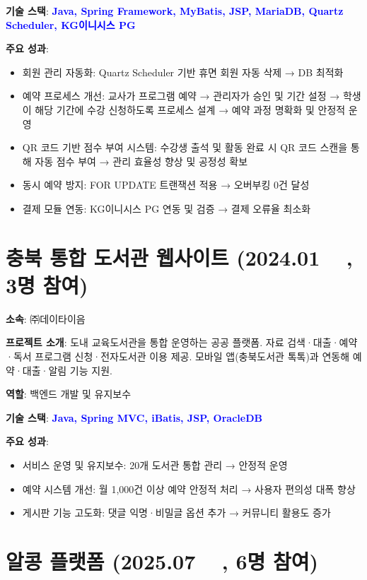 \documentclass[a4paper,11pt]{article}
\newcommand{\tech}[1]{\textbf{\textcolor{blue}{#1}}}
\begin{document}
\textbf{기술 스택}: \tech{Java, Spring Framework, MyBatis, JSP, MariaDB, Quartz Scheduler, KG이니시스 PG}

\textbf{주요 성과}:
\begin{itemize}[leftmargin=*]
  \item 회원 관리 자동화: Quartz Scheduler 기반 휴면 회원 자동 삭제 → DB 최적화
  \item 예약 프로세스 개선: 교사가 프로그램 예약 → 관리자가 승인 및 기간 설정 → 학생이 해당 기간에 수강 신청하도록 프로세스 설계 → 예약 과정 명확화 및 안정적 운영
  \item QR 코드 기반 점수 부여 시스템: 수강생 출석 및 활동 완료 시 QR 코드 스캔을 통해 자동 점수 부여 → 관리 효율성 향상 및 공정성 확보
  \item 동시 예약 방지: FOR UPDATE 트랜잭션 적용 → 오버부킹 0건 달성
  \item 결제 모듈 연동: KG이니시스 PG 연동 및 검증 → 결제 오류율 최소화
\end{itemize}

\section{충북 통합 도서관 웹사이트 (2024.01 ~ , 3명 참여)}

\textbf{소속}: ㈜데이타이음

\textbf{프로젝트 소개}:  
도내 교육도서관을 통합 운영하는 공공 플랫폼.  
자료 검색·대출·예약·독서 프로그램 신청·전자도서관 이용 제공.  
모바일 앱(충북도서관 톡톡)과 연동해 예약·대출·알림 기능 지원.

\textbf{역할}: 백엔드 개발 및 유지보수

\textbf{기술 스택}: \tech{Java, Spring MVC, iBatis, JSP, OracleDB}

\textbf{주요 성과}:
\begin{itemize}[leftmargin=*]
  \item 서비스 운영 및 유지보수: 20개 도서관 통합 관리 → 안정적 운영
  \item 예약 시스템 개선: 월 1,000건 이상 예약 안정적 처리 → 사용자 편의성 대폭 향상
  \item 게시판 기능 고도화: 댓글 익명·비밀글 옵션 추가 → 커뮤니티 활용도 증가
\end{itemize}

\section{알콩 플랫폼 (2025.07 ~ , 6명 참여)}
\end{document}
